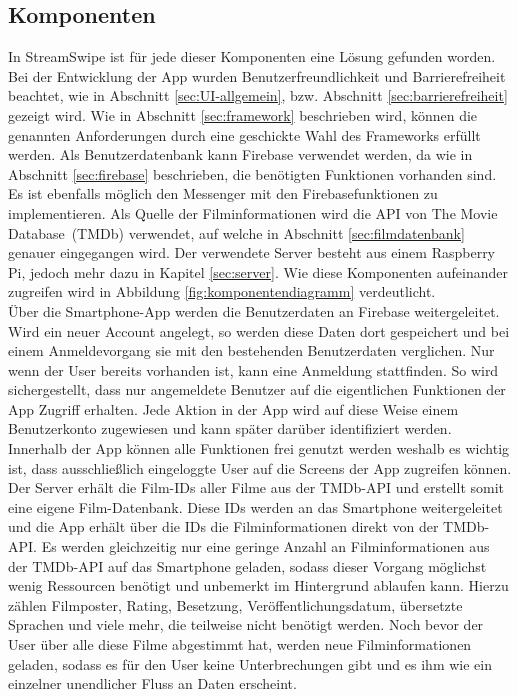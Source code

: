 \subsection{Komponenten}
\label{sec:komponenten}
In StreamSwipe ist für jede dieser Komponenten eine Lösung gefunden worden.
Bei der Entwicklung der App wurden Benutzerfreundlichkeit und Barrierefreiheit beachtet, wie in Abschnitt \ref{sec:UI-allgemein}, bzw. Abschnitt \ref{sec:barrierefreiheit} gezeigt wird. Wie in Abschnitt \ref{sec:framework} beschrieben wird, können die genannten Anforderungen durch eine geschickte Wahl des Frameworks erfüllt werden. Als Benutzerdatenbank kann Firebase verwendet werden, da wie in Abschnitt \ref{sec:firebase} beschrieben, die benötigten Funktionen vorhanden sind. Es ist ebenfalls möglich den Messenger mit den Firebasefunktionen zu implementieren. Als Quelle der Filminformationen wird die API von \glqq The Movie Database\grqq \, (TMDb) verwendet, auf welche in Abschnitt \ref{sec:filmdatenbank} genauer eingegangen wird. Der verwendete Server besteht aus einem Raspberry Pi, jedoch mehr dazu in Kapitel \ref{sec:server}. Wie diese Komponenten aufeinander zugreifen wird in Abbildung \ref{fig:komponentendiagramm} verdeutlicht.\\
Über die Smartphone-App werden die Benutzerdaten an Firebase weitergeleitet. Wird ein neuer Account angelegt, so werden diese Daten dort gespeichert und bei einem Anmeldevorgang sie mit den bestehenden Benutzerdaten verglichen. Nur wenn der User bereits vorhanden ist, kann eine Anmeldung stattfinden. So wird sichergestellt, dass nur angemeldete Benutzer auf die eigentlichen Funktionen der App Zugriff erhalten. Jede Aktion in der App wird auf diese Weise einem Benutzerkonto zugewiesen und kann später darüber identifiziert werden. Innerhalb der App können alle Funktionen frei genutzt werden weshalb es wichtig ist, dass ausschließlich eingeloggte User auf die Screens der App zugreifen können.\\
Der Server erhält die Film-IDs aller Filme aus der TMDb-API  und erstellt somit eine eigene Film-Datenbank. Diese IDs werden an das Smartphone weitergeleitet und die App erhält über die IDs die Filminformationen direkt von der TMDb-API. Es werden gleichzeitig nur eine geringe Anzahl an Filminformationen aus der TMDb-API auf das Smartphone geladen, sodass dieser Vorgang möglichst wenig Ressourcen benötigt und unbemerkt im Hintergrund ablaufen kann. Hierzu zählen Filmposter, Rating, Besetzung, Veröffentlichungsdatum, übersetzte Sprachen und viele mehr, die teilweise nicht benötigt werden. Noch bevor der User über alle diese Filme abgestimmt hat, werden neue Filminformationen geladen, sodass es für den User keine Unterbrechungen gibt und es ihm wie ein einzelner unendlicher Fluss an Daten erscheint. \\
